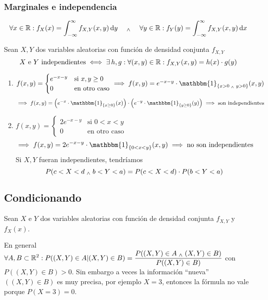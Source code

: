 \subsubsection{Marginales e independencia}

\[\forall x \in \R : f_{X} (x) = \int_{-\infty}^{\infty} f_{X, Y}(x, y) \odif{y} \quad \we \quad \forall y \in \R :  f_{Y} (y) = \int_{-\infty}^{\infty} f_{X, Y}(x, y) \odif{x}\]

\begin{teo}
	Sean $X, Y$ dos variables aleatorias con función de densidad conjunta $f_{X, Y}$
	\[ X \text{ e } Y \text{ independientes} \iff \exists \, h, g : \forall (x, y) \in \mathbb{R} : f_{X, Y}(x, y) = h(x) \cdot g(y)\]
\end{teo}

\begin{ejem}
	\begin{enumerate}
		\item $f(x, y) = \begin{cases}
				      e^{-x-y} & \text{si } x, y \geq 0 \\
				      0        & \text{en otro caso}
			      \end{cases} \implies f(x, y) = e^{-x-y} \cdot \mathbbm{1}_{\{x>0 \we y>0\}}(x, y)$
		      \[\implies f(x, y) = \left(e^{-x} \cdot \mathbbm{1}_{\{x\geq 0\}}(x)\right) \cdot \left(e^{-y} \cdot \mathbbm{1}_{\{y\geq 0\}}(y)\right) \implies \tex{son independientes}\]
		\item $f(x, y) = \begin{cases}
				      2e^{-x-y} & \text{si } 0 < x < y \\
				      0         & \text{en otro caso}
			      \end{cases}$
		      \[\implies f(x, y) = 2e^{-x-y} \cdot \mathbbm{1}_{\{0<x<y\}}(x, y) \implies \tex{no son independientes}\]
		      Si $X, Y$ fueran independientes, tendríamos
		      \[P(c < X < d \; _{\wedge} \; b < Y < a) = P(c < X < d) \cdot P(b < Y < a)\]
	\end{enumerate}
\end{ejem}

\subsection{Condicionando}

Sean $X$ e $Y$ dos variables aleatorias con función de densidad conjunta $f_{X, Y}$ y $f_X(x)$.

En general $\displaystyle \forall A, B \subset \mathbb{R}^2 : P((X, Y) \in A \vert (X, Y) \in B) = \frac{P((X, Y) \in A \; _{\wedge} \; (X, Y) \in B)}{P((X, Y) \in B)}$ con $P((X, Y) \in B) > 0$. Sin embargo a veces la información ``nueva'' $((X, Y)\in B)$ es muy precisa, por ejemplo $X=3$, entonces la fórmula no vale porque $P(X=3) = 0$.

